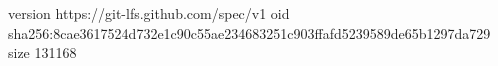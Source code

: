 version https://git-lfs.github.com/spec/v1
oid sha256:8cae3617524d732e1c90c55ae234683251c903ffafd5239589de65b1297da729
size 131168
